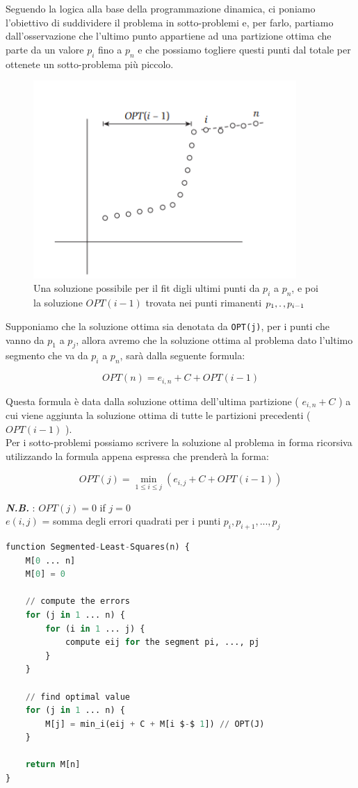 Seguendo la logica alla base della programmazione dinamica, ci poniamo
l'obiettivo di suddividere il problema in sotto-problemi e, per farlo,
partiamo dall'osservazione che l'ultimo punto appartiene ad una
partizione ottima che parte da un valore $p_i$ fino a $p_n$ e che
possiamo togliere questi punti dal totale per ottenete un sotto-problema
più piccolo.
\begin{figure}[H]
  \centering
  \includegraphics[width = 10cm, keepaspectratio]{capitoli/programmazione_dinamica/imgs/llsqr_funzionamento.png}
  \centering
  \caption{Una soluzione possibile per il fit digli ultimi punti da $p_i$ a $p_n$,
    e poi la soluzione $OPT(i-1)$ trovata nei punti rimanenti $p_1, \ldotp, p_{i-1}$}
\end{figure}
Supponiamo che la soluzione ottima sia denotata da
\texttt{OPT(j)}, per i punti che vanno da $p_1$ a $p_j$, allora
avremo che la soluzione ottima al problema dato l'ultimo segmento che va
da $p_i$ a $p_n$, sarà dalla seguente formula:

$$
  OPT(n) = e_{i,n} + C + OPT(i - 1)
$$

Questa formula è data dalla soluzione ottima dell'ultima partizione (
$e_{i,n} + C$ ) a cui viene aggiunta la soluzione ottima di tutte le
partizioni precedenti ( $OPT(i -1)$ ).\\

Per i sotto-problemi possiamo scrivere la soluzione al problema in forma
ricorsiva utilizzando la formula appena espressa che prenderà la forma:

$$
  OPT(j) = \min_{1 \leq i \leq j}(e_{i,j} + C + OPT(i - 1))
$$

\textbf{\emph{N.B.}} : $OPT(j) = 0$ if $j=0$\\

$e(i,j)$ = somma degli errori quadrati per i punti $p_i, p_{i+1},..., p_j$
\begin{lstlisting}[language=Python, mathescape=true]
function Segmented-Least-Squares(n) {
    M[0 ... n]
    M[0] = 0
    
    // compute the errors
    for (j in 1 ... n) {
        for (i in 1 ... j) {
            compute eij for the segment pi, ..., pj
        }
    }

    // find optimal value
    for (j in 1 ... n) {
        M[j] = min_i(eij + C + M[i $-$ 1]) // OPT(J)
    }

    return M[n]
}
\end{lstlisting}

